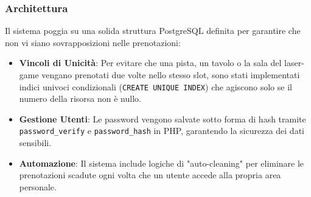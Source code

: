 \documentclass[a4paper, twoside]{report}
\begin{document}
\subsubsection*{Architettura}
Il sistema poggia su una solida struttura PostgreSQL definita per garantire che non vi siano sovrapposizioni nelle prenotazioni:
\begin{itemize}
  \item \textbf{Vincoli di Unicità}: Per evitare che una pista, un tavolo o la sala del laser-game vengano prenotati due volte nello stesso slot, sono stati implementati indici univoci condizionali (\texttt{CREATE UNIQUE INDEX}) che agiscono solo se il numero della risorsa non è nullo.
  \item \textbf{Gestione Utenti}: Le password vengono salvate sotto forma di hash tramite \texttt{password\_verify} e \texttt{password\_hash} in PHP, garantendo la sicurezza dei dati sensibili.
  \item \textbf{Automazione}: Il sistema include logiche di "auto-cleaning" per eliminare le prenotazioni scadute ogni volta che un utente accede alla propria area personale.
\end{itemize}
\end{document}
